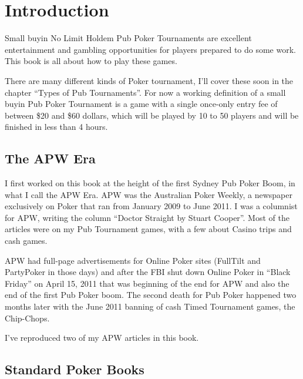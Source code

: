 \chapter{Introduction}


Small buyin No Limit Holdem Pub Poker Tournaments are excellent
entertainment and gambling opportunities for players prepared to do
some work. This book is all about how to play these games.

There are many different kinds of Poker tournament, I'll cover these
soon in the chapter ``Types of Pub Tournaments''. For now a
working definition of a small buyin
Pub Poker Tournament is a game with a single once-only entry fee of
between \$20 and \$60 dollars, which will be played by 10 to 50
players and will be finished in less than 4 hours.


\section{The APW Era}

I first worked on this book at the height of the first Sydney Pub
Poker Boom, in what I call the APW Era. APW was the Australian Poker
Weekly, a newspaper exclusively on Poker that ran from January 2009 to
June 2011. I was a columnist for APW, writing the column
``Doctor Straight by Stuart Cooper''. Most of the articles were on my
Pub Tournament games, with a few about Casino trips and cash games.

APW had full-page advertisements for Online Poker sites (FullTilt
and PartyPoker in those days) and after the FBI shut down Online Poker
in ``Black Friday'' on April 15, 2011 that was beginning of the end
for APW and also the end of the first Pub Poker boom. The second
death for Pub Poker happened two months later with the June 2011
banning of cash Timed Tournament games, the Chip-Chops.

I've reproduced two of my APW articles in this book.

\section{Standard Poker Books}

